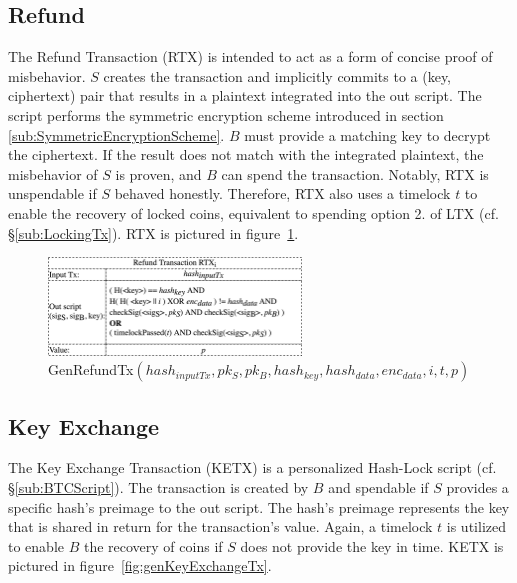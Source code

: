 \documentclass{cacthesis}
\begin{document}
        \subsection{Refund}
        \label{sub:RefundTx}
        The Refund Transaction (RTX) is intended to act as a form of concise proof of misbehavior. $S$ creates the transaction and implicitly commits to a (key, ciphertext) pair that results in a plaintext integrated into the out script. The script performs the symmetric encryption scheme introduced in section \ref{sub:SymmetricEncryptionScheme}. $B$ must provide a matching key to decrypt the ciphertext. If the result does not match with the integrated plaintext, the misbehavior of $S$ is proven, and $B$ can spend the transaction. Notably, RTX is unspendable if $S$ behaved honestly. Therefore, RTX also uses a timelock $t$ to enable the recovery of locked coins, equivalent to spending option 2. of LTX (cf. §\ref{sub:LockingTx}). RTX is pictured in \mbox{figure \ref{fig:genRefundTx}}.   
        
        \begin{figure}
            \begin{center}
              \includegraphics[width=0.6\textwidth]{images/GenRefundTx.png}
              \caption{\textsf{GenRefundTx}$(hash_{inputTx}, pk_S, pk_B, hash_{key}, hash_{data}, enc_{data}, i, t, p)$}
              \label{fig:genRefundTx}
            \end{center}
        \end{figure}
        
        \subsection{Key Exchange}
        \label{sub:KeyExchangeTx}
        The Key Exchange Transaction (KETX) is a personalized Hash-Lock script (cf. §\ref{sub:BTCScript}). The transaction is created by $B$ and spendable if $S$ provides a specific hash's preimage to the out script. The hash's preimage represents the key that is shared in return for the transaction's value. Again, a timelock $t$ is utilized to enable $B$ the recovery of coins if $S$ does not provide the key in time. KETX is pictured in \mbox{figure \ref{fig:genKeyExchangeTx}}.
        
\end{document}
